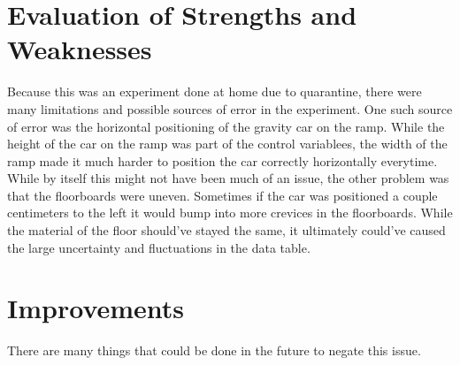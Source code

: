 \documentclass[12pt]{article}
\begin{document}
\section{Evaluation of Strengths and Weaknesses}
Because this was an experiment done at home due to quarantine, there were many limitations and possible sources of error in the experiment. One such source of error was the horizontal positioning of the gravity car on the ramp. While the height of the car on the ramp was part of the control variablees, the width of the ramp made it much harder to position the car correctly horizontally everytime. While by itself this might not have been much of an issue, the other problem was that the floorboards were uneven. Sometimes if the car was positioned a couple centimeters to the left it would bump into more crevices in the floorboards. While the material of the floor should've stayed the same, it ultimately could've caused the large uncertainty and fluctuations in the data table.

\section{Improvements}
There are many things that could be done in the future to negate this issue. 
\end{document}
